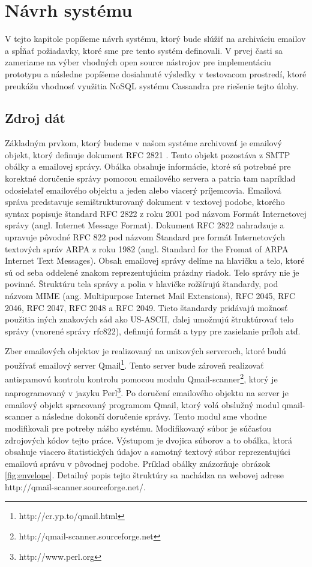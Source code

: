\documentclass[11pt,twoside,a4paper]{book}
\begin{document}
\chapter{Návrh systému}

V tejto kapitole popíšeme návrh systému, ktorý bude slúžiť na archiváciu emailov a spĺňať požiadavky, ktoré sme pre tento systém definovali. V prvej časti sa zameriame na výber vhodných open source nástrojov pre implementáciu prototypu a následne popíšeme dosiahnuté výsledky v testovacom prostredí, ktoré preukážu vhodnosť využitia NoSQL systému Cassandra pre riešenie tejto úlohy.

\section{Zdroj dát}
Základným prvkom, ktorý budeme v našom systéme archivovať je emailový objekt, ktorý definuje dokument RFC 2821 \cite{Klensin:2001:SMT:RFC2821}. Tento objekt pozostáva z SMTP obálky a emailovej správy. Obálka obsahuje informácie, ktoré sú potrebné pre korektné doručenie správy pomocou emailového servera a patria tam napríklad odosielateľ emailového objektu a jeden alebo viacerý príjemcovia. Emailová správa predstavuje semištrukturovaný dokument \cite{Udell} v textovej podobe, ktorého syntax popisuje štandard RFC 2822 \cite{Resnick:2001:IMF:RFC2822} z roku 2001 pod názvom Formát Internetovej správy (angl. Internet Message Format). Dokument RFC 2822 nahradzuje a upravuje pôvodné RFC 822 pod názvom Štandard pre formát Internetových textových správ ARPA z roku 1982 (angl. Standard for the Fromat of ARPA Internet Text Messages). Obsah emailovej správy delíme na hlavičku a telo, ktoré sú od seba oddelené znakom reprezentujúcim prázdny riadok. Telo správy nie je povinné. Štruktúru tela správy a polia v hlavičke rožšírujú štandardy, pod názvom MIME (ang. Multipurpose Internet Mail Extensions), RFC 2045, RFC 2046\cite{Freed:1996:MIM:RFC2045,Freed:1996:MIM:RFC2046}, RFC 2047, RFC 2048 a RFC 2049. Tieto štandardy pridávajú možnosť použitia iných znakových sád ako US-ASCII, ďalej umožnujú štruktúrovať telo správy (vnorené správy rfc822), definujú formát a typy pre zasielanie príloh atď.

Zber emailových objektov je realizovaný na unixových serveroch, ktoré budú používať emailový server Qmail\footnote{http://cr.yp.to/qmail.html}. Tento server bude zároveň realizovať antispamovú kontrolu kontrolu pomocou modulu Qmail-scanner\footnote{http://qmail-scanner.sourceforge.net}, ktorý je naprogramovaný v jazyku Perl\footnote{http://www.perl.org}. Po doručení emailového objektu na server je emailový objekt spracovaný programom Qmail, ktorý volá obslužný modul qmail-scanner a následne dokončí doručenie správy. Tento modul sme vhodne modifikovali pre potreby nášho systému. Modifikovaný súbor je súčasťou zdrojových kódov tejto práce. Výstupom je dvojica súborov a to obálka, ktorá obsahuje viacero štatistických údajov a samotný textový súbor reprezentujúci emailovú správu v pôvodnej podobe. Príklad obálky znázorňuje obrázok \ref{fig:envelope}. Detailný popis tejto štruktúry sa nachádza na webovej adrese http://qmail-scanner.sourceforge.net/.
\end{document}
